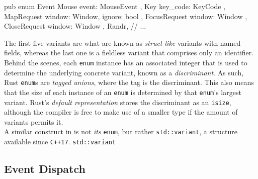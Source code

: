 \begin{rustblock}
  pub enum Event {
    Mouse { event: MouseEvent },
    Key { key_code: KeyCode },
    MapRequest { window: Window, ignore: bool },
    FocusRequest { window: Window },
    CloseRequest { window: Window },
    Randr,
    // ...
  }
\end{rustblock}

The   first  five   variants  are   what  are   known  as   \textit{struct-like}
variants   with  named   fields,   whereas   the  last   one   is  a   fieldless
variant  that   comprises  only  an   identifier\cite{therustreference}.  Behind
the   scenes,   each   \texttt{enum}  instance   has   an   associated
integer   that  is   used  to   determine  the   underlying  concrete   variant,
known   as  a   \textit{discriminant}\cite{therustreference}.   As  such,   Rust
\texttt{enum}s  are  \textit{tagged  unions},  where the  tag  is  the
discriminant.  This   also  means  that  the   size  of  each  instance   of  an
\texttt{enum} is determined  by that \texttt{enum}'s largest
variant. Rust's  \textit{default representation}  stores the discriminant  as an
\texttt{isize}, although the compiler is free to make use of a smaller
type if the amount of variants permits it\cite{therustreference}.\\

A  similar  construct  in   \cpp  is  not  \textit{its}  \texttt{enum},
but   rather  \texttt{std::variant},   a   structure  available   since
\texttt{C++17}. \texttt{std::variant}

\subsection{Event Dispatch}
{ \textcolor{gray}\blindtext }
